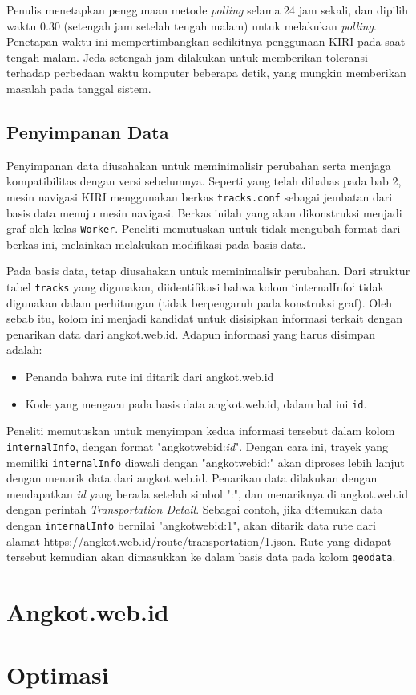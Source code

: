 Penulis menetapkan penggunaan metode \textit{polling} selama 24 jam sekali, dan dipilih waktu 0.30 (setengah jam setelah tengah malam) untuk melakukan \textit{polling}. Penetapan waktu ini mempertimbangkan sedikitnya penggunaan KIRI pada saat tengah malam. Jeda setengah jam dilakukan untuk memberikan toleransi terhadap perbedaan waktu komputer beberapa detik, yang mungkin memberikan masalah pada tanggal sistem. 

\subsection{Penyimpanan Data}

Penyimpanan data diusahakan untuk meminimalisir perubahan serta menjaga kompatibilitas dengan versi sebelumnya. Seperti yang telah dibahas pada bab 2, mesin navigasi KIRI menggunakan berkas \verb/tracks.conf/ sebagai jembatan dari basis data menuju mesin navigasi. Berkas inilah yang akan dikonstruksi menjadi graf oleh kelas \verb/Worker/. Peneliti memutuskan untuk tidak mengubah format dari berkas ini, melainkan melakukan modifikasi pada basis data.

Pada basis data, tetap diusahakan untuk meminimalisir perubahan. Dari struktur tabel \verb/tracks/ yang digunakan, diidentifikasi bahwa kolom `internalInfo` tidak digunakan dalam perhitungan (tidak berpengaruh pada konstruksi graf). Oleh sebab itu, kolom ini menjadi kandidat untuk disisipkan informasi terkait dengan penarikan data dari angkot.web.id. Adapun informasi yang harus disimpan adalah:

\begin{itemize}
	\item Penanda bahwa rute ini ditarik dari angkot.web.id
	\item Kode yang mengacu pada basis data angkot.web.id, dalam hal ini \verb/id/.
\end{itemize}

Peneliti memutuskan untuk menyimpan kedua informasi tersebut dalam kolom \verb/internalInfo/, dengan format "angkotwebid:\textit{id}". Dengan cara ini, trayek yang memiliki \verb/internalInfo/ diawali dengan "angkotwebid:" akan diproses lebih lanjut dengan menarik data dari angkot.web.id. Penarikan data dilakukan dengan mendapatkan \textit{id} yang berada setelah simbol ":", dan menariknya di angkot.web.id dengan perintah \textit{Transportation Detail}. Sebagai contoh, jika ditemukan data dengan \verb/internalInfo/ bernilai "angkotwebid:1", akan ditarik data rute dari alamat \url{https://angkot.web.id/route/transportation/1.json}. Rute yang didapat tersebut kemudian akan dimasukkan ke dalam basis data pada kolom \verb/geodata/.

\section{Angkot.web.id}

\section{Optimasi}